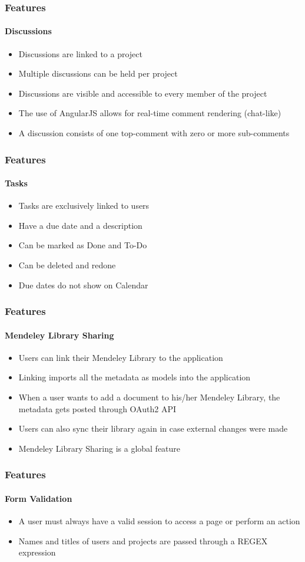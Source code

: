 \documentclass{beamer}
\begin{document}
\begin{frame}
\frametitle{Features}
\framesubtitle{Discussions}
	\begin{itemize}
		\item Discussions are linked to a project
		\item Multiple discussions can be held per project
		\item Discussions are visible and accessible to every member of the project
		\item The use of AngularJS allows for real-time comment rendering (chat-like)
		\item A discussion consists of one top-comment with zero or more sub-comments
	\end{itemize}
\end{frame}

\begin{frame}
\frametitle{Features}
\framesubtitle{Tasks}
	\begin{itemize}
		\item Tasks are exclusively linked to users
		\item Have a due date and a description
		\item Can be marked as Done and To-Do
		\item Can be deleted and redone
		\item Due dates do not show on Calendar
	\end{itemize}
\end{frame}

\begin{frame}
\frametitle{Features}
\framesubtitle{Mendeley Library Sharing}
	\begin{itemize}
		\item Users can link their Mendeley Library to the application
		\item Linking imports all the metadata as models into the application
		\item When a user wants to add a document to his/her Mendeley Library, the metadata gets posted through OAuth2 API
		\item Users can also sync their library again in case external changes were made
		\item Mendeley Library Sharing is a global feature
	\end{itemize}
\end{frame}

\begin{frame}
\frametitle{Features}
\framesubtitle{Form Validation}
	\begin{itemize}
		\item A user must always have a valid session to access a page or perform an action
		\item Names and titles of users and projects are passed through a REGEX expression
	\end{itemize}
\end{frame}
\end{document}
